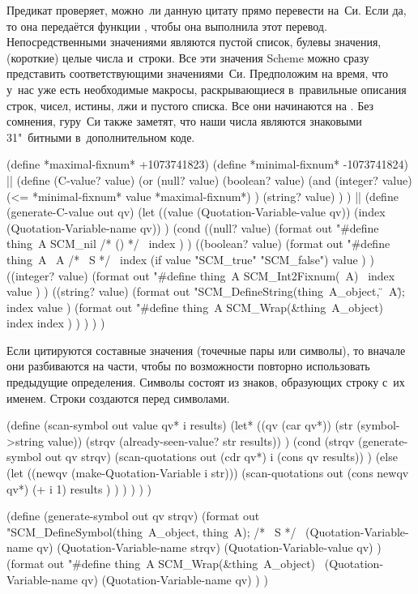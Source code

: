 Предикат  проверяет, можно~ли данную цитату прямо перевести на~Си.
Если да, то она передаётся функции , чтобы она выполнила
этот перевод. Непосредственными значениями являются пустой список, булевы
значения, (короткие) целые числа и~строки. Все эти значения Scheme можно сразу
представить соответствующими значениями~Си. Предположим на время, что у~нас уже
есть необходимые макросы, раскрывающиеся в~правильные описания строк, чисел,
истины, лжи и пустого списка. Все они начинаются на . Без сомнения,
гуру~Си также заметят, что наши числа являются знаковыми 31"~битными
в~дополнительном коде.

\begin{code:lisp}
(define *maximal-fixnum* +1073741823)
(define *minimal-fixnum* -1073741824)
||
(define (C-value? value)
  (or (null? value)
      (boolean? value)
      (and (integer? value)
           (<= *minimal-fixnum* value *maximal-fixnum*) )
      (string? value) ) )
||
(define (generate-C-value out qv)
  (let ((value (Quotation-Variable-value qv))
        (index (Quotation-Variable-name qv)) )
    (cond
      ((null? value)
        (format out "#define thing~A SCM_nil /* () */~%
                index ) )
      ((boolean? value)
        (format out "#define thing~A ~A /* ~S */~%
                index (if value "SCM_true" "SCM_false") value ) )
      ((integer? value)
        (format out "#define thing~A SCM_Int2Fixnum(~A)~%
                index value ) )
      ((string? value)
        (format out "SCM_DefineString(thing~A_object, \"~A\");~%
                index value )
        (format out "#define thing~A SCM_Wrap(&thing~A_object)~%
                index index ) ) ) ) )
\end{code:lisp}

Если цитируются составные значения (точечные пары или символы), то вначале они
разбиваются на части, чтобы по возможности повторно использовать предыдущие
определения. Символы состоят из знаков, образующих строку с~их именем. Строки
создаются перед символами.

\begin{code:lisp}
(define (scan-symbol out value qv* i results)
  (let* ((qv (car qv*))
         (str (symbol->string value))
         (strqv (already-seen-value? str results)) )
    (cond (strqv
            (generate-symbol out qv strqv)
            (scan-quotations out (cdr qv*) i (cons qv results)) )
          (else
            (let ((newqv (make-Quotation-Variable i str)))
              (scan-quotations out (cons newqv qv*)
                               (+ i 1) results ) ) ) ) ) )

(define (generate-symbol out qv strqv)
  (format out "SCM_DefineSymbol(thing~A_object, thing~A); /* ~S */~%
          (Quotation-Variable-name qv)
          (Quotation-Variable-name strqv)
          (Quotation-Variable-value qv) )
  (format out "#define thing~A SCM_Wrap(&thing~A_object)~%
          (Quotation-Variable-name qv)
          (Quotation-Variable-name qv) ) )
\end{code:lisp}

